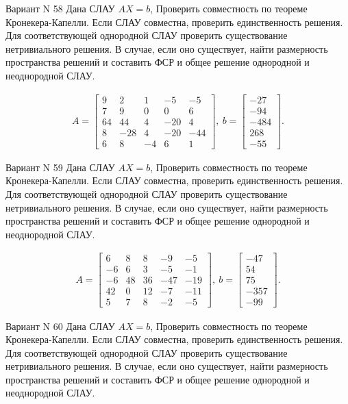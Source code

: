 \documentclass[11pt]{report}
\begin{document}
Вариант N 58
Дана СЛАУ $AX = b$,
Проверить совместность по теореме Кронекера-Капелли. Если СЛАУ совместна, проверить единственность решения.
Для соответствующей однородной СЛАУ проверить существование нетривиального решения. В случае, если оно существует,
найти размерность пространства решений и составить ФСР и общее решение однородной  и неоднородной СЛАУ.


\begin{align*}
 A = \left[\begin{matrix}9 & 2 & 1 & -5 & -5\\7 & 9 & 0 & 0 & 6\\64 & 44 & 4 & -20 & 4\\8 & -28 & 4 & -20 & -44\\6 & 8 & -4 & 6 & 1\end{matrix}\right],
\ b = \left[\begin{matrix}-27\\-94\\-484\\268\\-55\end{matrix}\right]. 
 \end{align*}

Вариант N 59
Дана СЛАУ $AX = b$,
Проверить совместность по теореме Кронекера-Капелли. Если СЛАУ совместна, проверить единственность решения.
Для соответствующей однородной СЛАУ проверить существование нетривиального решения. В случае, если оно существует,
найти размерность пространства решений и составить ФСР и общее решение однородной  и неоднородной СЛАУ.


\begin{align*}
 A = \left[\begin{matrix}6 & 8 & 8 & -9 & -5\\-6 & 6 & 3 & -5 & -1\\-6 & 48 & 36 & -47 & -19\\42 & 0 & 12 & -7 & -11\\5 & 7 & 8 & -2 & -5\end{matrix}\right],
\ b = \left[\begin{matrix}-47\\54\\75\\-357\\-99\end{matrix}\right]. 
 \end{align*}

Вариант N 60
Дана СЛАУ $AX = b$,
Проверить совместность по теореме Кронекера-Капелли. Если СЛАУ совместна, проверить единственность решения.
Для соответствующей однородной СЛАУ проверить существование нетривиального решения. В случае, если оно существует,
найти размерность пространства решений и составить ФСР и общее решение однородной  и неоднородной СЛАУ.
\end{document}

